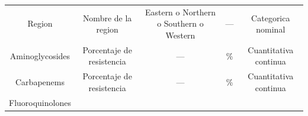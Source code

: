 \documentclass[
]{article}
\begin{document}
\begin{longtable}[]{@{}ccccc@{}}
\begin{minipage}[t]{0.16\columnwidth}
Region\strut
\end{minipage} & \begin{minipage}[t]{0.21\columnwidth}\centering
Nombre de la region\strut
\end{minipage} & \begin{minipage}[t]{0.24\columnwidth}\centering
Eastern o Northern o Southern o Western\strut
\end{minipage} & \begin{minipage}[t]{0.07\columnwidth}\centering
---\strut
\end{minipage} & \begin{minipage}[t]{0.18\columnwidth}\centering
Categorica nominal\strut
\end{minipage}\tabularnewline
\begin{minipage}[t]{0.16\columnwidth}\centering
Aminoglycosides\strut
\end{minipage} & \begin{minipage}[t]{0.21\columnwidth}\centering
Porcentaje de resistencia\strut
\end{minipage} & \begin{minipage}[t]{0.24\columnwidth}\centering
---\strut
\end{minipage} & \begin{minipage}[t]{0.07\columnwidth}\centering
\%\strut
\end{minipage} & \begin{minipage}[t]{0.18\columnwidth}\centering
Cuantitativa continua\strut
\end{minipage}\tabularnewline
\begin{minipage}[t]{0.16\columnwidth}\centering
Carbapenems\strut
\end{minipage} & \begin{minipage}[t]{0.21\columnwidth}\centering
Porcentaje de resistencia\strut
\end{minipage} & \begin{minipage}[t]{0.24\columnwidth}\centering
---\strut
\end{minipage} & \begin{minipage}[t]{0.07\columnwidth}\centering
\%\strut
\end{minipage} & \begin{minipage}[t]{0.18\columnwidth}\centering
Cuantitativa continua\strut
\end{minipage}\tabularnewline
\begin{minipage}[t]{0.16\columnwidth}\centering
Fluoroquinolones\strut
\end{minipage} & \begin{minipage}[t]{0.21\columnwidth}\centering

\end{minipage}
\end{longtable}
\end{document}
